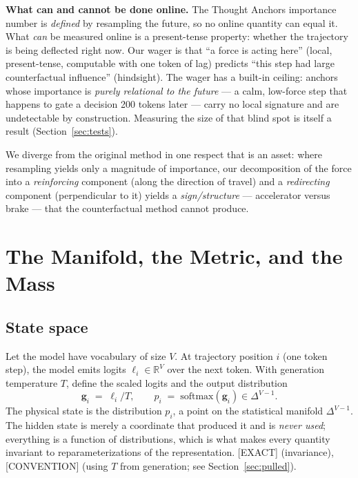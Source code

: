 \documentclass[11pt]{article}
\newcommand{\softmax}{\mathrm{softmax}}
\begin{document}
\begin{honestbox}
\textbf{What can and cannot be done online.} The Thought Anchors importance number is \emph{defined} by resampling the future, so no online quantity can equal it. What \emph{can} be measured online is a present-tense property: whether the trajectory is being deflected right now. Our wager is that ``a force is acting here'' (local, present-tense, computable with one token of lag) predicts ``this step had large counterfactual influence'' (hindsight). The wager has a built-in ceiling: anchors whose importance is \emph{purely relational to the future} --- a calm, low-force step that happens to gate a decision 200 tokens later --- carry no local signature and are undetectable by construction. Measuring the size of that blind spot is itself a result (Section~\ref{sec:tests}).
\end{honestbox}

We diverge from the original method in one respect that is an asset: where resampling yields only a magnitude of importance, our decomposition of the force into a \emph{reinforcing} component (along the direction of travel) and a \emph{redirecting} component (perpendicular to it) yields a \emph{sign/structure} --- accelerator versus brake --- that the counterfactual method cannot produce.

\section{The Manifold, the Metric, and the Mass}

\subsection{State space}
Let the model have vocabulary of size $V$. At trajectory position $i$ (one token step), the model emits logits $\bm{\ell}_i \in \mathbb{R}^V$ over the next token. With generation temperature $T$, define the scaled logits and the output distribution
\begin{equation}
  \bm{g}_i \;=\; \bm{\ell}_i / T, \qquad
  p_i \;=\; \softmax(\bm{g}_i) \in \Delta^{V-1}.
\end{equation}
The physical state is the distribution $p_i$, a point on the statistical manifold $\Delta^{V-1}$. The hidden state is merely a coordinate that produced it and is \emph{never used}; everything is a function of distributions, which is what makes every quantity invariant to reparameterizations of the representation. \textsf{[EXACT]} (invariance), \textsf{[CONVENTION]} (using $T$ from generation; see Section~\ref{sec:pulled}).
\end{document}
